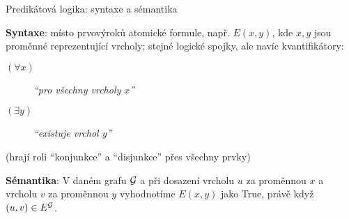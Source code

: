 \documentclass{beamer}
\begin{document}
\begin{frame}{Predikátová logika: syntaxe a sémantika}

    \textbf{Syntaxe}: místo prvovýroků \alert{atomické formule}, např. $E(x,y)$, kde $x,y$ jsou \alert{proměnné} reprezentující vrcholy; stejné logické spojky, ale navíc \alert{kvantifikátory}:
  
    \begin{description}
        \item[\alert{\( (\forall x) \)}] {\it``pro všechny vrcholy \(x\)''}
        \item[\alert{\( (\exists y) \)}] {\it``existuje vrchol \(y\)''}
    \end{description}
    (hrají roli ``konjunkce'' a ``disjunkce'' přes všechny prvky)
    
    \textbf{Sémantika}: V daném grafu \(\mathcal{G}\) a při \alert{dosazení} vrcholu \(u\) za proměnnou \(x\) a vrcholu \(v\) za proměnnou \(y\) \alert{vyhodnotíme} \( E(x,y) \) jako \alert{True}, právě když \alert{\( (u,v)\in E^{\mathcal{G}} \)}.
        
\end{frame}
\end{document}
